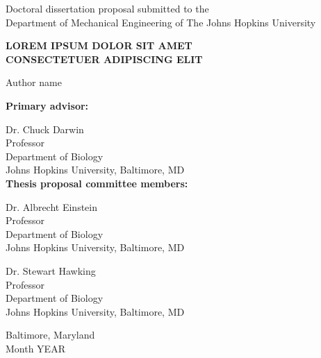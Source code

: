 \documentclass[12pt]{article}
\numberwithin{equation}{section}
\begin{document}
\vspace*{0.025in}
\thispagestyle{empty}

\begin{center}
    Doctoral dissertation proposal submitted to the \\
    Department of Mechanical Engineering of The Johns Hopkins University \\
    
    \vspace{0.75in}

    \MakeUppercase{\textbf{LOREM IPSUM DOLOR SIT AMET\\CONSECTETUER ADIPISCING ELIT}}       %
    
    \vspace{0.25in}
    
    Author name   %
\end{center}

\vspace{0.5in}

\begin{singlespace}

    \textbf{Primary advisor:}
    
    Dr. Chuck Darwin \\
    Professor \\
    Department of Biology \\
    Johns Hopkins University, Baltimore, MD \\

    
    \textbf{Thesis proposal committee members:} 
    
    Dr. Albrecht Einstein \\
    Professor\\
    Department of Biology \\
    Johns Hopkins University, Baltimore, MD
    
    Dr. Stewart Hawking \\
    Professor\\
    Department of Biology \\
    Johns Hopkins University, Baltimore, MD 
    
\end{singlespace}

\vspace{0.75in}
\begin{center}
    Baltimore, Maryland \\  %
    Month YEAR              %
\end{center}
\end{document}
